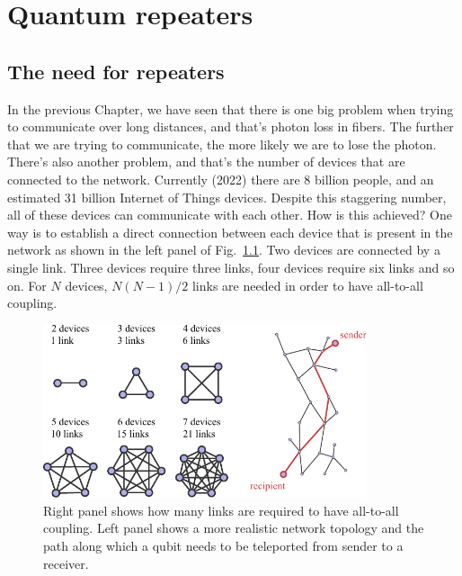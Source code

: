 \chapter{Quantum repeaters}
\label{sec:12_quantum_repeaters}
\label{ch:repeaters}

\section{The need for repeaters}
\label{sec:12-1_need_for_repeaters}

In the previous Chapter, we have seen that there is one big problem when trying to communicate over long distances, and that's photon loss in fibers.
The further that we are trying to communicate, the more likely we are to lose the photon.
There's also another problem, and that's the number of devices that are connected to the network. Currently (2022) there are 8 billion people, and an estimated 31 billion Internet of Things devices.
Despite this staggering number, all of these devices can communicate with each other.
How is this achieved?
One way is to establish a direct connection between each device that is present in the network as shown in the left panel of Fig.~\ref{fig:12-1_all_to_all}.
Two devices are connected by a single link.
Three devices require three links, four devices require six links and so on.
For $N$ devices, $N (N - 1) / 2$ links are needed in order to have all-to-all coupling.

\begin{figure}[t]
    \centering
    \includegraphics[width=0.85\textwidth]{lesson12/12-1_all_to_all.pdf}
    \caption[All-to-all coupling]{Right panel shows how many links are required to have all-to-all coupling. Left panel shows a more realistic network topology and the path along which a qubit needs to be teleported from sender to a receiver.}
    \label{fig:12-1_all_to_all}
\end{figure}

